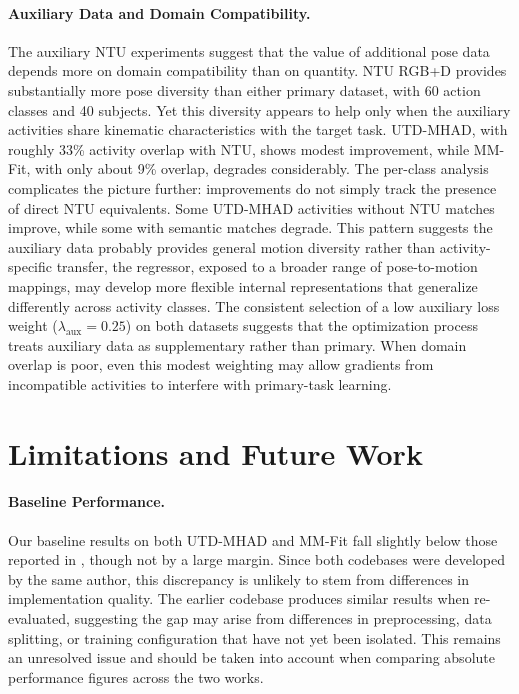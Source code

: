 \paragraph{Auxiliary Data and Domain Compatibility.}
The auxiliary NTU experiments suggest that the value of additional pose data depends more on domain compatibility than on quantity. NTU RGB+D\cite{shahroudy2016ntu} provides substantially more pose diversity than either primary dataset, with 60 action classes and 40 subjects. Yet this diversity appears to help only when the auxiliary activities share kinematic characteristics with the target task. UTD-MHAD, with roughly 33\% activity overlap with NTU, shows modest improvement, while MM-Fit, with only about 9\% overlap, degrades considerably. The per-class analysis complicates the picture further: improvements do not simply track the presence of direct NTU equivalents. Some UTD-MHAD activities without NTU matches improve, while some with semantic matches degrade. This pattern suggests the auxiliary data probably provides general motion diversity rather than activity-specific transfer, the regressor, exposed to a broader range of pose-to-motion mappings, may develop more flexible internal representations that generalize differently across activity classes. The consistent selection of a low auxiliary loss weight ($\lambda_{\text{aux}} = 0.25$) on both datasets suggests that the optimization process treats auxiliary data as supplementary rather than primary. When domain overlap is poor, even this modest weighting may allow gradients from incompatible activities to interfere with primary-task learning.

\section{Limitations and Future Work}
\label{sec:limitations}

\paragraph{Baseline Performance.}
Our baseline results on both UTD-MHAD\cite{chen2015utd} and MM-Fit\cite{stromback2020mm} fall slightly below those reported in \cite{zolfaghari2024sensor}, though not by a large margin. Since both codebases were developed by the same author, this discrepancy is unlikely to stem from differences in implementation quality. The earlier codebase produces similar results when re-evaluated, suggesting the gap may arise from differences in preprocessing, data splitting, or training configuration that have not yet been isolated. This remains an unresolved issue and should be taken into account when comparing absolute performance figures across the two works.


